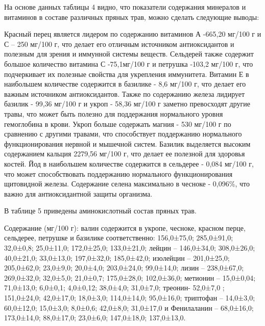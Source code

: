 \begin{multicols}{2}
На основе данных таблицы 4 видно, что показатели содержания минералов и
витаминов в составе различных пряных трав, можно сделать следующие
выводы:

Красный перец является лидером по содержанию витаминов А -665,20 мг/100
г и С -- 250 мг/100 г, что делает его отличным источником антиоксидантов
и полезным для зрения и иммунной системы веществ. Сельдерей также
содержит большое количество витамина С -75,1мг/100 г и петрушка -103,2
мг/100 г, что подчеркивает их полезные свойства для укрепления
иммунитета. Витамин Е в наибольшем количестве содержится в базилике -
8,6 мг/100 г, что делает его важным источником антиоксидантов. Также по
содержанию железа лидирует базилик - 99,36 мг/100 г и укроп - 58,36
мг/100 г заметно превосходят другие травы, что может быть полезно для
поддержания нормального уровня гемоглобина в крови. Укроп больше
содержать магния - 530 мг/100 г по сравнению с другими травами, что
способствует поддержанию нормального функционирования нервной и мышечной
систем. Базилик выделяется высоким содержанием кальция 2279,56 мг/100 г,
что делает ее полезной для здоровья костей. Йод в наибольшем количестве
содержится в сельдерее - 0,084 мг/100 г, что может способствовать
поддержанию нормального функционирования щитовидной железы. Содержание
селена максимально в чесноке - 0,096\%, что важно для антиоксидантной
защиты организма.

В таблице 5 приведены аминокислотный состав пряных трав.

Содержание (мг/100 г): валин содержится в укропе, чесноке, красном
перце, сельдерее, петрушке и базилике соответственно: 156,0±75,0;
285,0±91,0; 32,0±0,8; 25,0±11,0; 172,0±25,0; 133,0±21,0; лейцин --
146,0±34,0; 308,0±26,0; 40,0±21,0; 33,0±13,0; 197,0±32,0; 185,0±42,0;
изолейцин -- 201,0±25,0; 205,0±62,0; 23,0±9,0; 20,0±4,0; 203,0±24,0;
99,0±14,0; лизин -- 238,0±67,0; 269,0±32,0; 32,0±5,0; 21,0±0,7;
175,0±28,0; 102,0±36,0; метионин -- 15,0±0,04; 71,0±13,0; 6,0±0,1;
4,0±0,12; 38,0±4,0; 31,0±7,0; треонин- 52,0±7,0 ; 151,0±24,0; 42,0±17,0;
18,0±3,0; 114,0±14,0; 95,0±16,0; триптофан -- 14,0±3,0; 60,0±12,0;
15,0±3,0; 8,0±0,6; 42,0±8,0; 31,0±17,0 и Фенилаланин -- 68,0±16,0;
173,0±14,0; 88,0±17,0; 23,0±6,0; 147,0±18,0; 137,0±13,0.
\end{multicols}

